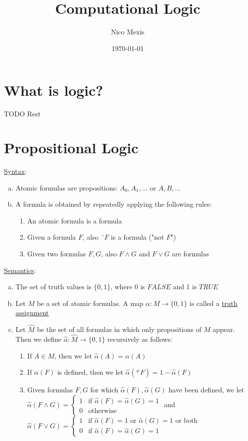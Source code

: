 \documentclass[a4paper]{article}
\title{Computational Logic}
\author{Nico Mexis}
\date{\today}
\newcommand{\ul}{\underline}
\begin{document}
\maketitle
\newpage

\tableofcontents
\newpage

\section{What is logic?}
TODO Rest\\
\section{Propositional Logic}
\ul{Syntax}:
\begin{enumerate}[(a)]
	\item Atomic formulas are propositions: $A_0,A_1,\dots$ or $A,B,\dots$
	\item A formula is obtained by repeatedly applying the following rules:
	\begin{enumerate}[(1)]
		\item An atomic formula is a formula
		\item Given a formula $F$, also $^\neg F$ is a formula ("not $F$")
		\item Given two formulas $F,G$, also $F\wedge G$ and $F\vee G$ are formulas
	\end{enumerate}
\end{enumerate}
\ul{Semantics}:
\begin{enumerate}[(a)]
	\item The set of truth values is $\{0,1\}$, where 0 is $FALSE$ and 1 is $TRUE$
	\item Let $M$ be a set of atomic formulas. A map $\alpha:M\rightarrow\{0,1\}$ is called a \ul{truth assignment}
	\item Let $\hat{M}$ be the set of all formulas in which only propositions of $M$ appear.\\
	Then we define $\hat{\alpha}:\hat{M}\rightarrow\{0,1\}$ recursively as follows:
	\begin{enumerate}[(1)]
		\item If $A\in M$, then we let $\hat{\alpha}(A)=\alpha(A)$
		\item If $\alpha(F)$ is defined, then we let $\hat{\alpha}(^\neq F)=1-\hat{\alpha}(F)$
		\item Given formulas $F,G$ for which $\hat{\alpha}(F),\hat{\alpha}(G)$ have been defined, we let $\hat{\alpha}(F\wedge G)=\begin{cases}
		1 & \text{if } \hat{\alpha}(F)=\hat{\alpha}(G)=1\\
		0 & \text{otherwise}
		\end{cases}$ and $\hat{\alpha}(F\vee G)=\begin{cases}
		1 & \text{if } \hat{\alpha}(F)=1 \text{ or } \hat{\alpha}(G)=1 \text{ or both}\\
		0 & \text{if } \hat{\alpha}(F)=\hat{\alpha}(G)=1
		\end{cases}$
	\end{enumerate}
\end{enumerate}
\end{document}
